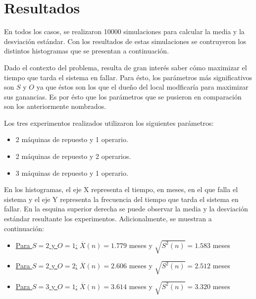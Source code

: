 \section{Resultados}

    \par En todos los casos, se realizaron 10000 simulaciones para calcular la media
    y la desviación estándar. Con los resultados de estas simulaciones se
    contruyeron los distintos histogramas que se presentan a continuación.

    \par Dado el contexto del problema, resulta de gran interés saber cómo maximizar el
    tiempo que tarda el sistema en fallar. Para ésto, los parámetros más
    significativos son $S$ y $O$ ya que éstos son los que el dueño del
    local modficaría para maximizar sus ganancias.
    Es por ésto que los parámetros que se pusieron en comparación son los
    anteriormente nombrados.

    \par Los tres experimentos realizados utilizaron los siguientes parámetros:
        \begin{itemize}
            \item{2 máquinas de repuesto y 1 operario.}
            \item{2 máquinas de repuesto y 2 operarios.}
            \item{3 máquinas de repuesto y 1 operario.}
        \end{itemize}

    \par En los histogramas, el eje X representa el tiempo, en meses, en el que falla el
    sistema y el eje Y representa la frecuencia del tiempo que tarda el sistema en
    fallar.
    En la esquina superior derecha se puede observar la media y la desviación
    estándar resultante los experimentos.
    Adicionalmente, se muestran a continuación:
        \begin{itemize}
            \item{\underline{Para $S = 2$ y $O = 1$:}
                    $ \overline{X}(n) = 1.779 $ meses y $ \sqrt{S^2(n)} = 1.583 $ meses}
            \item{\underline{Para $S = 2$ y $O = 2$:}
                    $ \overline{X}(n) = 2.606 $ meses y $ \sqrt{S^2(n)} = 2.512 $ meses}
            \item{\underline{Para $S = 3$ y $O = 1$:}
                    $ \overline{X}(n) = 3.614 $ meses y $ \sqrt{S^2(n)} = 3.320 $ meses}
        \end{itemize}



